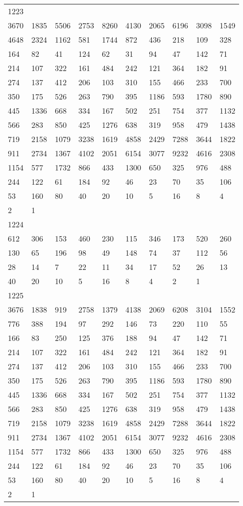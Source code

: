 \begin{longtable}{*{10}{l}}
1223&&&&&&&&&\\
3670& 1835& 5506& 2753& 8260& 4130& 2065& 6196& 3098& 1549\\
4648& 2324& 1162& 581& 1744& 872& 436& 218& 109& 328\\
164& 82& 41& 124& 62& 31& 94& 47& 142& 71\\
214& 107& 322& 161& 484& 242& 121& 364& 182& 91\\
274& 137& 412& 206& 103& 310& 155& 466& 233& 700\\
350& 175& 526& 263& 790& 395& 1186& 593& 1780& 890\\
445& 1336& 668& 334& 167& 502& 251& 754& 377& 1132\\
566& 283& 850& 425& 1276& 638& 319& 958& 479& 1438\\
719& 2158& 1079& 3238& 1619& 4858& 2429& 7288& 3644& 1822\\
911& 2734& 1367& 4102& 2051& 6154& 3077& 9232& 4616& 2308\\
1154& 577& 1732& 866& 433& 1300& 650& 325& 976& 488\\
244& 122& 61& 184& 92& 46& 23& 70& 35& 106\\
53& 160& 80& 40& 20& 10& 5& 16& 8& 4\\
2& 1& \\

1224&&&&&&&&&\\
612& 306& 153& 460& 230& 115& 346& 173& 520& 260\\
130& 65& 196& 98& 49& 148& 74& 37& 112& 56\\
28& 14& 7& 22& 11& 34& 17& 52& 26& 13\\
40& 20& 10& 5& 16& 8& 4& 2& 1& \\

1225&&&&&&&&&\\
3676& 1838& 919& 2758& 1379& 4138& 2069& 6208& 3104& 1552\\
776& 388& 194& 97& 292& 146& 73& 220& 110& 55\\
166& 83& 250& 125& 376& 188& 94& 47& 142& 71\\
214& 107& 322& 161& 484& 242& 121& 364& 182& 91\\
274& 137& 412& 206& 103& 310& 155& 466& 233& 700\\
350& 175& 526& 263& 790& 395& 1186& 593& 1780& 890\\
445& 1336& 668& 334& 167& 502& 251& 754& 377& 1132\\
566& 283& 850& 425& 1276& 638& 319& 958& 479& 1438\\
719& 2158& 1079& 3238& 1619& 4858& 2429& 7288& 3644& 1822\\
911& 2734& 1367& 4102& 2051& 6154& 3077& 9232& 4616& 2308\\
1154& 577& 1732& 866& 433& 1300& 650& 325& 976& 488\\
244& 122& 61& 184& 92& 46& 23& 70& 35& 106\\
53& 160& 80& 40& 20& 10& 5& 16& 8& 4\\
2& 1& \\


\end{longtable}
